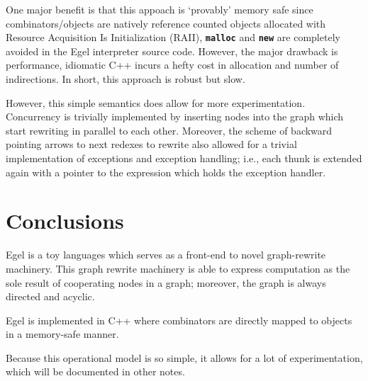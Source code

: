 \documentclass{research4cacm}
\newcommand{\code}[1]{{\bf\texttt{#1}}}
\begin{document}
One major benefit is that this appoach is `provably'
memory safe since combinators/objects are natively
reference counted objects allocated with
Resource Acquisition Is Initialization (RAII),
\code{malloc} and \code{new} are 
completely avoided in the Egel interpreter source
code. However, the major drawback is
performance, idiomatic C++ incurs a hefty cost in
allocation and number of indirections. In short,
this approach is robust but slow.

However, this simple semantics does allow for
more experimentation. Concurrency is trivially
implemented by inserting nodes into the graph
which start rewriting in parallel to each other.
Moreover, the scheme of backward pointing arrows
to next redexes to rewrite also allowed for a
trivial implementation of exceptions and 
exception handling; i.e., each thunk is extended
again with a pointer to the expression which
holds the exception handler.

\section{Conclusions}

Egel is a toy languages which serves as a front-end
to novel graph-rewrite machinery. This graph rewrite
machinery is able to express computation as the 
sole result of cooperating nodes in a graph; moreover,
the graph is always directed and acyclic.

Egel is implemented in C++ where combinators
are directly mapped to objects in a memory-safe
manner.

Because this operational model is so simple, it
allows for a lot of experimentation, which will
be documented in other notes.



\balancecolumns
\end{document}
